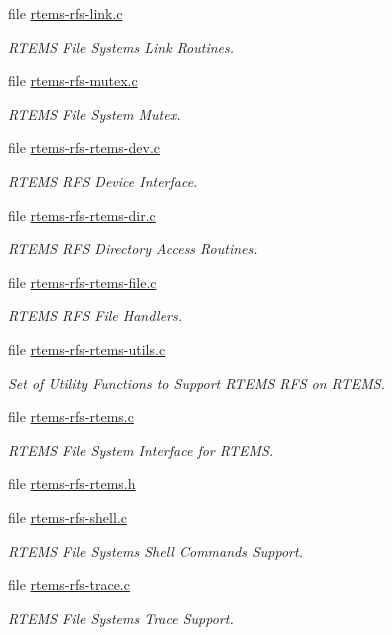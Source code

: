 \begin{DoxyCompactItemize}
file \mbox{\hyperlink{rtems-rfs-link_8c}{rtems-\/rfs-\/link.\+c}}
\begin{DoxyCompactList}\small\item\em R\+T\+E\+MS File Systems Link Routines. \end{DoxyCompactList}\item 
file \mbox{\hyperlink{rtems-rfs-mutex_8c}{rtems-\/rfs-\/mutex.\+c}}
\begin{DoxyCompactList}\small\item\em R\+T\+E\+MS File System Mutex. \end{DoxyCompactList}\item 
file \mbox{\hyperlink{rtems-rfs-rtems-dev_8c}{rtems-\/rfs-\/rtems-\/dev.\+c}}
\begin{DoxyCompactList}\small\item\em R\+T\+E\+MS R\+FS Device Interface. \end{DoxyCompactList}\item 
file \mbox{\hyperlink{rtems-rfs-rtems-dir_8c}{rtems-\/rfs-\/rtems-\/dir.\+c}}
\begin{DoxyCompactList}\small\item\em R\+T\+E\+MS R\+FS Directory Access Routines. \end{DoxyCompactList}\item 
file \mbox{\hyperlink{rtems-rfs-rtems-file_8c}{rtems-\/rfs-\/rtems-\/file.\+c}}
\begin{DoxyCompactList}\small\item\em R\+T\+E\+MS R\+FS File Handlers. \end{DoxyCompactList}\item 
file \mbox{\hyperlink{rtems-rfs-rtems-utils_8c}{rtems-\/rfs-\/rtems-\/utils.\+c}}
\begin{DoxyCompactList}\small\item\em Set of Utility Functions to Support R\+T\+E\+MS R\+FS on R\+T\+E\+MS. \end{DoxyCompactList}\item 
file \mbox{\hyperlink{rtems-rfs-rtems_8c}{rtems-\/rfs-\/rtems.\+c}}
\begin{DoxyCompactList}\small\item\em R\+T\+E\+MS File System Interface for R\+T\+E\+MS. \end{DoxyCompactList}\item 
file \mbox{\hyperlink{rtems-rfs-rtems_8h}{rtems-\/rfs-\/rtems.\+h}}
\item 
file \mbox{\hyperlink{rtems-rfs-shell_8c}{rtems-\/rfs-\/shell.\+c}}
\begin{DoxyCompactList}\small\item\em R\+T\+E\+MS File Systems Shell Commands Support. \end{DoxyCompactList}\item 
file \mbox{\hyperlink{rtems-rfs-trace_8c}{rtems-\/rfs-\/trace.\+c}}
\begin{DoxyCompactList}\small\item\em R\+T\+E\+MS File Systems Trace Support. \end{DoxyCompactList}\end{DoxyCompactItemize}
